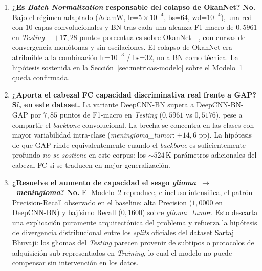 \begin{enumerate}
  \item \textbf{¿Es \textit{Batch Normalization} responsable
        del colapso de OkanNet?} \textbf{No.} Bajo el régimen
        adaptado (AdamW, lr=$5\times 10^{-4}$, bs=$64$,
        wd=$10^{-4}$), una red con $10$ capas convolucionales
        y BN tras cada una alcanza F1-macro de $0{,}5961$ en
        \textit{Testing} ---$+17{,}28$ puntos porcentuales
        sobre OkanNet---, con curvas de convergencia
        monótonas y sin oscilaciones. El colapso de OkanNet
        era atribuible a la combinación lr=$10^{-3}$ /
        bs=$32$, no a BN como técnica. La hipótesis sostenida
        en la Sección~\ref{sec:metricas-modelo} sobre el
        Modelo~1 queda confirmada.

  \item \textbf{¿Aporta el cabezal FC capacidad
        discriminativa real frente a GAP?} \textbf{Sí, en
        este dataset.} La variante DeepCNN-BN supera a
        DeepCNN-BN-GAP por $7{,}85$ puntos de F1-macro en
        \textit{Testing} ($0{,}5961$ vs $0{,}5176$), pese a
        compartir el \textit{backbone} convolucional. La
        brecha se concentra en las clases con mayor
        variabilidad intra-clase (\textit{meningioma\_tumor}:
        $+14{,}6$ pp). La hipótesis de que GAP rinde
        equivalentemente cuando el \textit{backbone} es
        suficientemente profundo \emph{no se sostiene} en
        este corpus: los $\sim 524$\,K parámetros adicionales
        del cabezal FC sí se traducen en mejor generalización.

  \item \textbf{¿Resuelve el aumento de capacidad el sesgo
        \textit{glioma}~$\to$~\textit{meningioma}?}
        \textbf{No.} El Modelo~2 reproduce, e incluso
        intensifica, el patrón Precision-Recall observado en
        el baseline: alta Precision ($1{,}0000$ en DeepCNN-BN)
        y bajísimo Recall ($0{,}1600$) sobre
        \textit{glioma\_tumor}. Esto descarta una explicación
        puramente arquitectónica del problema y refuerza la
        hipótesis de divergencia distribucional entre los
        \textit{splits} oficiales del dataset Sartaj Bhuvaji:
        los gliomas del \textit{Testing} parecen provenir de
        subtipos o protocolos de adquisición sub-representados
        en \textit{Training}, lo cual el modelo no puede
        compensar sin intervención en los datos.
\end{enumerate}

